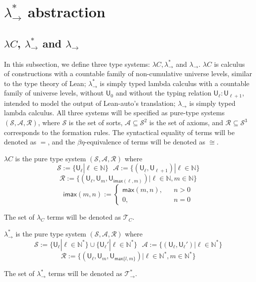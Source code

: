 \section{$\lambda_\to^*$ abstraction}\label{sectabst}

\subsection{$\lambda C$, $\lambda_\to^*$ and $\lambda_\to$}

In this subsection, we define three type systems: $\lambda C, \lambda_\to^*$ and $\lambda_\to$. $\lambda C$
is calculus of constructions with a countable family of non-cumulative universe levels, similar
to the type theory of Lean; $\lambda_\to^*$ is simply typed lambda calculus with a countable
family of universe levels, without $\mathsf{U}_0$ and without the typing relation
$\mathsf{U}_\ell : \mathsf{U}_{\ell + 1}$, intended to model the output of Lean-auto's translation;
$\lambda_\to$ is simply typed lambda calculus. All three systems will be
specified as pure-type systems $(\mathcal{S}, \mathcal{A}, \mathcal{R})$, where $\mathcal{S}$
is the set of sorts, $\mathcal{A} \subseteq \mathcal{S}^2$ is the set of axioms, and
$\mathcal{R} \subseteq \mathcal{S}^3$ corresponds to the formation rules. The syntactical
equality of terms will be denoted as $=$, and the $\beta\eta$-equivalence of terms will be
denoted as $\cong$.

\begin{definition} $\lambda C$ is the pure type system $(\mathcal{S}, \mathcal{A}, \mathcal{R})$ where
  $$\mathcal{S} := \{\mathsf{U}_\ell | \ell \in \mathbb{N}\} \ \ \ \mathcal{A} := \{(\mathsf{U}_\ell, \mathsf{U}_{\ell + 1}) | \ell \in \mathbb{N}\}$$
  $$\mathcal{R} := \{(\mathsf{U}_\ell, \mathsf{U}_m, \mathsf{U}_{\mathsf{imax}(\ell, m)}) | \ell \in \mathbb{N}, m \in \mathbb{N}\}$$
  $$\mathsf{imax}(m, n) := \left\{\begin{aligned}
    \mathsf{max}(m, n), & & n > 0 \\
    0, & & n = 0
  \end{aligned}\right.$$

  The set of $\lambda_C$ terms will be denoted as $\mathcal{T}_C$.
\end{definition}

\begin{definition} $\lambda_\to^*$ is the pure type system $(\mathcal{S}, \mathcal{A}, \mathcal{R})$ where
  $$\mathcal{S} := \{\mathsf{U}_\ell | \ell \in \mathbb{N}^*\} \cup \{\mathsf{U}_\ell' | \ell \in \mathbb{N}^*\} \ \ \
    \mathcal{A} := \{(\mathsf{U}_\ell, \mathsf{U}_\ell') | \ell \in \mathbb{N}^*\}$$
  $$\mathcal{R} := \{(\mathsf{U}_\ell, \mathsf{U}_m, \mathsf{U}_{\mathsf{max} \{l, m\}}) | \ell \in \mathbb{N}^*, m \in \mathbb{N}^*\}$$

  The set of $\lambda_\to^*$ terms will be denoted as $\mathcal{T}_\to^*$.
\end{definition}


